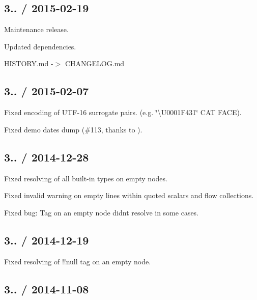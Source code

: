 \subsection*{3.. / 2015-\/02-\/19 }


\begin{DoxyItemize}
\item Maintenance release.
\item Updated dependencies.
\item H\+I\+S\+T\+O\+R\+Y.\+md -\/$>$ C\+H\+A\+N\+G\+E\+L\+O\+G.\+md
\end{DoxyItemize}

\subsection*{3.. / 2015-\/02-\/07 }


\begin{DoxyItemize}
\item Fixed encoding of U\+T\+F-\/16 surrogate pairs. (e.\+g. \char`\"{}\textbackslash{}\+U0001\+F431\char`\"{} C\+A\+T F\+A\+C\+E).
\item Fixed demo dates dump (\#113, thanks to ).
\end{DoxyItemize}

\subsection*{3.. / 2014-\/12-\/28 }


\begin{DoxyItemize}
\item Fixed resolving of all built-\/in types on empty nodes.
\item Fixed invalid warning on empty lines within quoted scalars and flow collections.
\item Fixed bug\+: Tag on an empty node didn\textquotesingle{}t resolve in some cases.
\end{DoxyItemize}

\subsection*{3.. / 2014-\/12-\/19 }


\begin{DoxyItemize}
\item Fixed resolving of !!null tag on an empty node.
\end{DoxyItemize}

\subsection*{3.. / 2014-\/11-\/08 }


